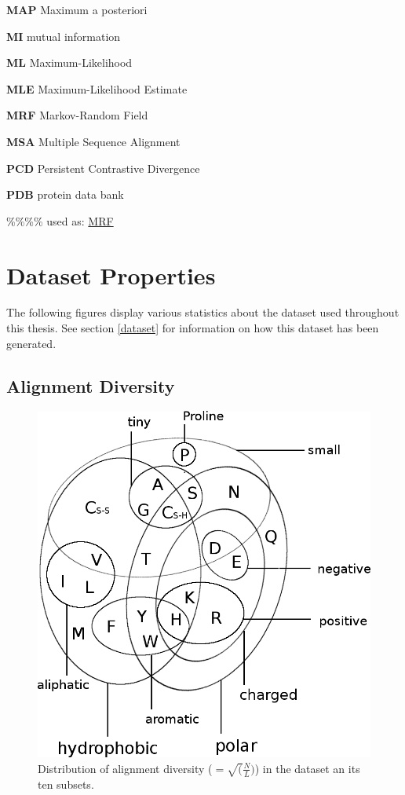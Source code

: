 \documentclass[12pt,a4paper,twoside]{book}
\theoremstyle{definition}
\theoremstyle{definition}
\theoremstyle{remark}
\begin{document}
\textbf{MAP} Maximum a posteriori

\textbf{MI} mutual information

\textbf{ML} Maximum-Likelihood

\textbf{MLE} Maximum-Likelihood Estimate

\textbf{MRF} Markov-Random Field

\textbf{MSA} Multiple Sequence Alignment

\textbf{PCD} Persistent Contrastive Divergence

\textbf{PDB} protein data bank

\%\%\%\% used as: \protect\hyperlink{abbrev}{MRF}

\chapter{Dataset Properties}\label{dataset-properties}

The following figures display various statistics about the dataset used
throughout this thesis. See section \ref{dataset} for information on how
this dataset has been generated.

\section{Alignment Diversity}\label{alignment-diversity}




\begin{figure}
\includegraphics[width=1\linewidth]{img/amino_acid_physico_chemical_properties_venn_diagramm} \caption{Distribution of alignment diversity
(\(=\sqrt(\frac{N}{L})\)) in the dataset an its ten subsets.}\label{fig:dataset-diversity}
\end{figure}
\end{document}
